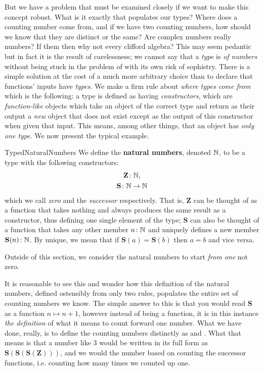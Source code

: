 \documentclass[11pt]{article}
\begin{document}
But we have a problem that must be examined closely if we want to make this concept robust. What is it exactly that populates our types? Where does a counting number come from, and if we have two counting numbers, how should we know that they are distinct or the same? Are complex numbers really numbers? If them then why not every clifford algebra? This may seem pedantic but in fact it is the result of carelessness; we cannot say that a \emph{type} is \emph{of numbers} without being stuck in the problem of  with its own risk of sophistry. There is a simple solution at the cost of a much more arbitrary choice than to declare that functions' inputs have \emph{types}. We make a firm rule about \emph{where types come from} which is the following: a type is defined as having \emph{constructors}, which are \emph{function-like} objects which take an object of the correct type and return as their output a \emph{new} object that does not exist except as the output of this constructor when given that input. This means, among other things, that an object has \emph{only one type}. We now present the typical example.

\begin{label definition}{TypedNaturalNumbers}
We define the \textbf{natural numbers}, denoted $\mathbb{N}$, to be a type with the following constructors:\begin{gather*}
   \mathbf{Z}\colon \mathbb{N}, \\
   \mathbf{S}\colon \mathbb{N} \to \mathbb{N}
\end{gather*}
which we call \emph{zero} and the \emph{successor} respectively. That is, $\mathbf{Z}$ can be thought of as a function that takes nothing and always produces the same result as a constructor, thus defining one single element of the type; $\mathbf{S}$ can also be thought of a function that takes any other member $n \colon \mathbb{N}$ and uniquely defines a new member $\mathbf{S}(n) \colon \mathbb{N}$. By unique, we mean that if $\mathbf{S}(a) = \mathbf{S}(b)$ then $a = b$ and vice versa.

Outside of this section, we consider the natural numbers to start \emph{from one} not zero.
\end{label definition}

It is reasonable to see this and wonder how this definition of the natural numbers, defined ostensibly from only two rules, populates the entire set of counting numbers we know. The simple answer to this is that you would read $\mathbf{S}$ as a function $n \mapsto n + 1$, however instead of being a function, it is in this instance \emph{the definition} of what it means to count forward one number. What we have done, really, is to define the counting numbers distinctly as  and . What that means is that a number like $3$ would be written in its full form as $\mathbf{S}(\mathbf{S}(\mathbf{S}(\mathbf{Z})))$, and we would  the number based on counting the successor functions, i.e. counting how many times we counted up one.
\end{document}
